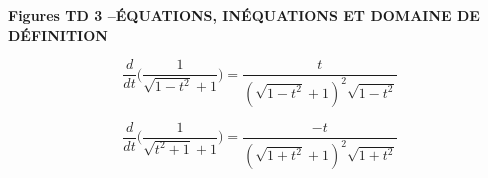 \documentclass[a4paper,11pt]{article}
\begin{document}



\begin{center}
{\bf Figures TD 3 \quad--\quad \'EQUATIONS, IN\'EQUATIONS ET DOMAINE DE 
D\'EFINITION}
\end{center}
\bigskip 

$$\dfrac{d}{dt} \big( \dfrac{1}{\sqrt{1 - t^2 } + 1} \big) = \dfrac{t}{ (\sqrt{1 - t^2} + 1)^2 \sqrt{1 - t^2} }
$$

$$\dfrac{d}{dt} \big( \dfrac{1}{\sqrt{t^2 + 1} + 1} \big) = \dfrac{-t}{ (\sqrt{1 + t^2} + 1)^2 \sqrt{1 + t^2} }
$$

\addtocounter{rep}{14}

\end{document}
